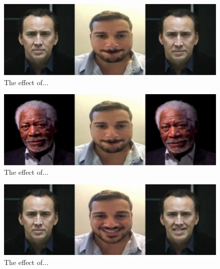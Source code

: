 \documentclass[english,12pt]{article}
\begin{document}
\pagebreak{}

\begin{figure}[htb]
  \begin{centering}
      \includegraphics[scale=0.25]{images/‏‏Amit_lips_cage.PNG}
  \par\end{centering}
  \caption{\label{fig:Amit_lips_cage}The effect of...}
\end{figure}

\begin{figure}[htb]
  \begin{centering}
      \includegraphics[scale=0.25]{images/‏‏Amit_lips_freeman.PNG}
  \par\end{centering}
  \caption{\label{fig:Amit_lips_freeman}The effect of...}
\end{figure}

\begin{figure}[htb]
  \begin{centering}
      \includegraphics[scale=0.25]{images/‏‏Amit_smile_cage.PNG}
  \par\end{centering}
  \caption{\label{fig:Amit_smile_cage}The effect of...}
\end{figure}
\end{document}
